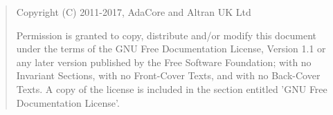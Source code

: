 \bigskip
\begin{quote}
   Copyright (C) 2011-2017, AdaCore and Altran UK Ltd

   Permission is granted to copy, distribute and/or modify this document
   under the terms of the GNU Free Documentation License, Version 1.1
   or any later version published by the Free Software Foundation;
   with no Invariant Sections, with no Front-Cover Texts, and with no
   Back-Cover Texts.
   A copy of the license is included in the section entitled 'GNU
   Free Documentation License'.
\end{quote}
\bigskip

